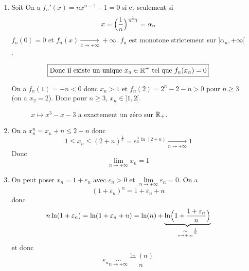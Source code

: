 \begin{solution}
	\phantom{}
	\begin{enumerate}
		\item Soit 
		On a $f_{n}'(x)=nx^{n-1}-1=0$ si et seulement si 
		$$x=\Bigl(\frac{1}{n}\Bigr)^{\frac{1}{n-1}}=\alpha_{n}$$
		$f_{n}(0)=0$ et $f_{n}(x)\xrightarrow[x\to+\infty]{}+\infty$.
		$f_{n}$ est monotone strictement sur $]\alpha_{n},+\infty[$.
		
		$$\boxed{\text{Donc il existe un unique }x_{n}\in\mathbb{R}^{+}\text{ tel que }f_{n}(x_{n})=0}$$

		On a $f_{n}(1)=-n<0$ donc $x_{n}>1$ et $f_{n}(2)=2^{n}-2-n>0$ pour $n\geqslant3$ (on a $x_{2}=2$). Donc pour $n\geqslant3$, $x_{n}\in]1,2[$.

		\begin{figure}[!ht]
			\centering
			\caption{$x\mapsto x^{3}-x-3$ a exactement un zéro sur $\mathbb{R}_{+}$.}
		\end{figure}

		\item On a $x_{n}^{n}=x_{n}+n\leqslant2+n$ donc 
		$$1\leqslant x_{n}\leqslant(2+n)^{\frac{1}{n}}=e^{\frac{1}{n}\ln(2+n)}\xrightarrow[n\to+\infty]{}1$$
		Donc 
		$$\boxed{\lim\limits_{n\to+\infty}x_{n}=1}$$

		\item On peut poser $x_{n}=1+\varepsilon_{n}$ avec $\varepsilon_{n}>0$ et $\lim\limits_{n\to+\infty}\varepsilon_{n}=0$. On a 
		$$(1+\varepsilon_{n})^{n}=1+\varepsilon_{n}+n$$
		donc 
		$$n\ln(1+\varepsilon_{n})=\ln(1+\varepsilon_{n}+n)=\ln(n)+\underbrace{\ln\Bigl(1+\frac{1+\varepsilon_{n}}{n}\Bigr)}_{\underset{n\to+\infty}{\sim}\frac{1}{n}}$$
		et donc 
		$$\varepsilon_{n}\underset{n\to+\infty}{\sim}\frac{\ln(n)}{n}$$


\end{enumerate}
\end{solution}
